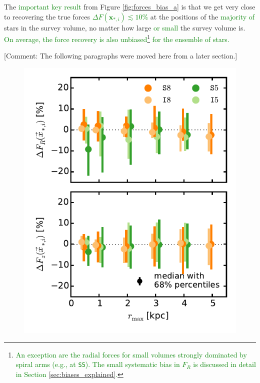\documentclass[iop,revtex4,numberedappendix,appendixfloats]{emulateapj}
\newcommand{\vect}[1]{\boldsymbol{#1}}
\newcommand{\NEW}[1]{\textcolor{Green}{#1}}
\newcommand{\OLD}[1]{}
\newcommand{\COMMENT}[1]{\textcolor{ProcessBlue}{#1}}
\begin{document}
The \OLD{first and most important thing to learn}\NEW{important key result} from Figure \ref{fig:forces_bias_a} is that we get very close to recovering the true forces \NEW{$\Delta F(\vect{x}_{*,i}) \lesssim 10\%$}  at the positions of the \NEW{majority of} stars in the survey volume, no matter how large \NEW{or small} the survey volume is. \NEW{On average, the force recovery is also unbiased\footnote{\NEW{An exception are the radial forces for small volumes strongly dominated by spiral arms (e.g., at \texttt{S5}). The small systematic bias in $F_R$ is discussed in detail in Section \ref{sec:biases_explained}.}} for the ensemble of stars.}

\COMMENT{[Comment: The following paragraphs were moved here from a later section.]}

\begin{figure}[!htbp]
\centering
  \includegraphics[width=\columnwidth]{fig/MNdHHdiffSph2_bias_in_forces_recovery_3_a.pdf}

\end{figure}
\end{document}

